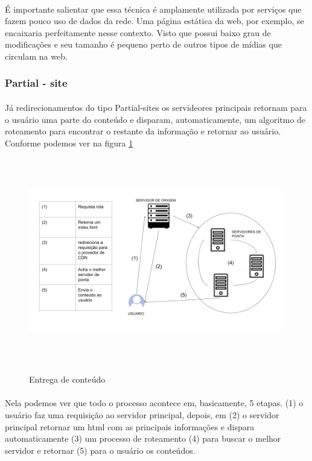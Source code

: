 \paragraph{} \'E importante salientar que essa t\'ecnica \'e amplamente utilizada por servi\c{c}os que fazem pouco uso de dados da rede. Uma p\'agina est\'atica da web, por exemplo, se encaixaria perfeitamente nesse contexto. Visto que possui baixo grau de modifica\c{c}\~oes e seu tamanho \'e pequeno perto de outros tipos de m\'idias que circulam na web.

\subsubsection{Partial - site}
\paragraph{} J\'a redirecionamentos do tipo Partial-sites os servideores principais retornam para o usu\'ario uma parte do conte\'udo e disparam, automaticamente, um algoritmo de roteamento para encontrar o restante da informa\c{c}\~ao e retornar ao usu\'ario. Conforme podemos ver na figura \ref{figura:entrega_conteudo}
\begin{figure}[H]
\caption{Entrega de conte\'udo}
\includegraphics[height=9cm]{Figuras/entrega_conteudo.png} 
\label{figura:entrega_conteudo}
\end{figure}
\paragraph{}  Nela podemos ver que todo o processo acontece em, basicamente, 5 etapas. (1) o usu\'ario faz uma requisi\c{c}\~ao ao servidor principal, depois, em (2) o servidor principal retornar um html com as principais informa\c{c}\~oes e dispara automaticamente (3) um processo de roteamento (4) para buscar o melhor servidor e retornar (5) para o usu\'ario os conte\'udos.
